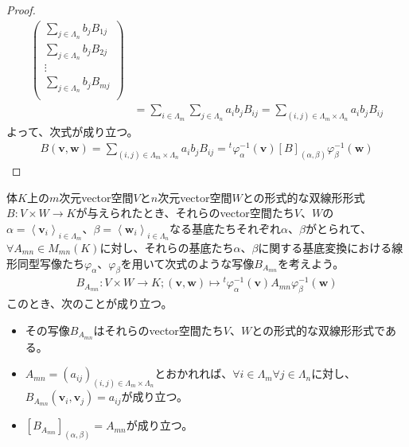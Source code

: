 \documentclass[dvipdfmx]{jsarticle}
\begin{document}
\begin{proof}
\begin{align*}
\begin{pmatrix}
\sum_{j \in \varLambda_{n}} {b_{j}B_{1j}} \\
\sum_{j \in \varLambda_{n}} {b_{j}B_{2j}} \\
 \vdots \\
\sum_{j \in \varLambda_{n}} {b_{j}B_{mj}} \\
\end{pmatrix}\\
&= \sum_{i \in \varLambda_{m}} {\sum_{j \in \varLambda_{n}} {a_{i}b_{j}B_{ij}}} = \sum_{(i,j) \in \varLambda_{m} \times \varLambda_{n}} {a_{i}b_{j}B_{ij}}
\end{align*}
よって、次式が成り立つ。
\begin{align*}
B\left( \mathbf{v},\mathbf{w} \right) = \sum_{(i,j) \in \varLambda_{m} \times \varLambda_{n}} {a_{i}b_{j}B_{ij}} ={}^{t}\varphi_{\alpha}^{- 1}\left( \mathbf{v} \right)[ B]_{(\alpha,\beta)}\varphi_{\beta}^{- 1}\left( \mathbf{w} \right)
\end{align*}
\end{proof}
\begin{thm}\label{2.4.3.4}
体$K$上の$m$次元vector空間$V$と$n$次元vector空間$W$との形式的な双線形形式$B:V \times W \rightarrow K$が与えられたとき、それらのvector空間たち$V$、$W$の$\alpha = \left\langle \mathbf{v}_{i} \right\rangle_{i \in \varLambda_{m}}$、$\beta = \left\langle \mathbf{w}_{i} \right\rangle_{i \in \varLambda_{n}}$なる基底たちそれぞれ$\alpha$、$\beta$がとられて、$\forall A_{mn} \in M_{mn}(K)$に対し、それらの基底たち$\alpha$、$\beta$に関する基底変換における線形同型写像たち$\varphi_{\alpha}$、$\varphi_{\beta}$を用いて次式のような写像$B_{A_{mn}}$を考えよう。
\begin{align*}
B_{A_{mn}}:V \times W \rightarrow K;\left( \mathbf{v},\mathbf{w} \right) \mapsto{}^{t}\varphi_{\alpha}^{- 1}\left( \mathbf{v} \right)A_{mn}\varphi_{\beta}^{- 1}\left( \mathbf{w} \right)
\end{align*}
このとき、次のことが成り立つ。
\begin{itemize}
\item
  その写像$B_{A_{mn}}$はそれらのvector空間たち$V$、$W$との形式的な双線形形式である。
\item
  $A_{mn} = \left( a_{ij} \right)_{(i,j) \in \varLambda_{m} \times \varLambda_{n}}$とおかれれば、$\forall i \in \varLambda_{m}\forall j \in \varLambda_{n}$に対し、$B_{A_{mn}}\left( \mathbf{v}_{i},\mathbf{v}_{j} \right) = a_{ij}$が成り立つ。
\item
  $\left[ B_{A_{mn}} \right]_{(\alpha,\beta)} = A_{mn}$が成り立つ。
\end{itemize}
\end{thm}
\end{document}
